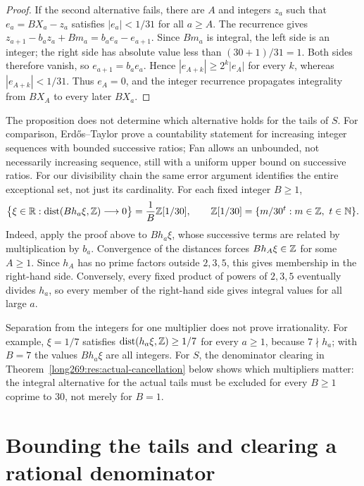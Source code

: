 \documentclass[11pt]{article}
\theoremstyle{remark}
\theoremstyle{plain}
\begin{document}
\begin{proof}
If the second alternative fails, there are $A$ and integers $z_a$ such
that $e_a=BX_a-z_a$ satisfies $|e_a|<1/31$ for all $a\ge A$.
The recurrence gives
$z_{a+1}-b_az_a+Bm_a=b_ae_a-e_{a+1}$.  Since $Bm_a$ is integral, the
left side is an integer; the right side has absolute value less than
$(30+1)/31=1$.  Both sides therefore vanish, so $e_{a+1}=b_ae_a$.
Hence $|e_{A+k}|\ge2^k|e_A|$ for every $k$, whereas
$|e_{A+k}|<1/31$.  Thus $e_A=0$, and the integer recurrence propagates
integrality from $BX_A$ to every later $BX_a$.
\end{proof}

The proposition does not determine which alternative holds for the
tails of $S$.
For comparison, Erd\H{o}s--Taylor
\cite[Theorem~1, p.~600]{erdostaylor1957} prove a countability statement for
increasing integer sequences with bounded successive ratios; Fan
\cite[Lemma~3.1, arXiv v1]{fan2026strongly} allows an unbounded, not
necessarily increasing sequence, still with a uniform upper bound on
successive ratios.
For our divisibility chain the same error argument identifies the entire
exceptional set, not just its cardinality.  For each fixed integer $B\ge1$,
\[
 \bigl\{\xi\in\mathbb{R}:\operatorname{dist}(Bh_a\xi,\mathbb{Z})\longrightarrow0\bigr\}
 =\frac1B\mathbb{Z}[1/30],
 \qquad
 \mathbb{Z}[1/30]=\{m/30^t:m\in\mathbb{Z},\ t\in\mathbb{N}\}.
\]
Indeed, apply the proof above to $Bh_a\xi$, whose successive terms are
related by multiplication by $b_a$.  Convergence of the distances forces
$Bh_A\xi\in\mathbb{Z}$ for some $A\ge1$.  Since $h_A$ has no prime factors outside
$2,3,5$, this gives membership in the right-hand side.  Conversely, every
fixed product of powers of $2,3,5$ eventually divides $h_a$, so every
member of the right-hand side gives integral values for all large $a$.

Separation from the integers for one multiplier does not prove
irrationality.  For example, $\xi=1/7$ satisfies
$\operatorname{dist}(h_a\xi,\mathbb{Z})\ge1/7$ for every $a\ge1$, because
$7\nmid h_a$; with $B=7$ the values $Bh_a\xi$ are all integers.
For $S$, the denominator clearing in
Theorem~\ref{long269:res:actual-cancellation} below shows which multipliers
matter: the integral alternative for the actual tails must be excluded
for every $B\ge1$ coprime to $30$, not merely for $B=1$.

\section{Bounding the tails and clearing a rational denominator}
\label{long269:sec:actual-orbit}
\end{document}
